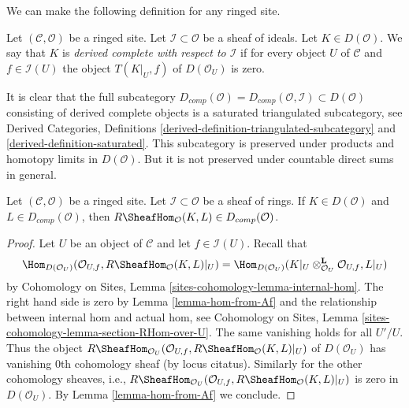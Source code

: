 \noindent
We can make the following definition for any ringed site.

\begin{definition}
\label{definition-derived-complete}
Let $(\mathcal{C}, \mathcal{O})$ be a ringed site.
Let $\mathcal{I} \subset \mathcal{O}$ be a sheaf of ideals.
Let $K \in D(\mathcal{O})$. We say that $K$ is
{\it derived complete with respect to $\mathcal{I}$}
if for every object $U$ of $\mathcal{C}$ and $f \in \mathcal{I}(U)$
the object $T(K|_U, f)$ of $D(\mathcal{O}_U)$ is zero.
\end{definition}

\noindent
It is clear that the full subcategory
$D_{comp}(\mathcal{O}) = D_{comp}(\mathcal{O}, \mathcal{I}) \subset
D(\mathcal{O})$ consisting of derived complete objects
is a saturated triangulated subcategory, see
Derived Categories, Definitions
\ref{derived-definition-triangulated-subcategory} and
\ref{derived-definition-saturated}. This subcategory is preserved
under products and homotopy limits in $D(\mathcal{O})$.
But it is not preserved under countable direct sums in general.

\begin{lemma}
\label{lemma-derived-complete-internal-hom}
Let $(\mathcal{C}, \mathcal{O})$ be a ringed site.
Let $\mathcal{I} \subset \mathcal{O}$ be a sheaf of rings.
If $K \in D(\mathcal{O})$ and $L \in D_{comp}(\mathcal{O})$, then
$R\SheafHom_\mathcal{O}(K, L) \in D_{comp}(\mathcal{O})$.
\end{lemma}

\begin{proof}
Let $U$ be an object of $\mathcal{C}$ and let $f \in \mathcal{I}(U)$.
Recall that
$$
\Hom_{D(\mathcal{O}_U)}(\mathcal{O}_{U, f}, R\SheafHom_\mathcal{O}(K, L)|_U)
=
\Hom_{D(\mathcal{O}_U)}(
K|_U \otimes_{\mathcal{O}_U}^\mathbf{L} \mathcal{O}_{U, f}, L|_U)
$$
by Cohomology on Sites, Lemma \ref{sites-cohomology-lemma-internal-hom}.
The right hand side is zero by Lemma \ref{lemma-hom-from-Af}
and the relationship between internal hom and actual hom, see
Cohomology on Sites, Lemma \ref{sites-cohomology-lemma-section-RHom-over-U}.
The same vanishing holds for all $U'/U$. Thus the object
$R\SheafHom_{\mathcal{O}_U}(\mathcal{O}_{U, f},
R\SheafHom_\mathcal{O}(K, L)|_U)$ of $D(\mathcal{O}_U)$ has vanishing
$0$th cohomology sheaf (by locus citatus). Similarly for the other
cohomology sheaves, i.e., $R\SheafHom_{\mathcal{O}_U}(\mathcal{O}_{U, f},
R\SheafHom_\mathcal{O}(K, L)|_U)$ is zero in $D(\mathcal{O}_U)$.
By Lemma \ref{lemma-hom-from-Af} we conclude.
\end{proof}

